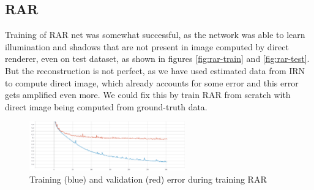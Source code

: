 \subsection{RAR}
Training of RAR net was somewhat successful, as the network was able to learn illumination and shadows that are not present in image computed by direct renderer, even on test dataset, as shown in figures \ref{fig:rar-train} and \ref{fig:rar-test}. But the reconstruction is not perfect, as we have used estimated data from IRN to compute direct image, which already accounts for some error and this error gets amplified even more. We could fix this by train RAR from scratch with direct image being computed from ground-truth data.
\begin{figure}[H]
    \centerline{\includegraphics[width=0.6\textwidth]{praca/images/Training-RAR.png}}
    \caption[Training and validation error for RAR]{Training (blue) and validation (red) error during training RAR}
    \label{img:training-rar}
\end{figure}

